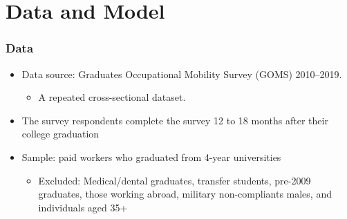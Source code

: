\documentclass[aspectratio=169,xcolor=dvipsnames,handout]{beamer}
\begin{document}
\section{Data and Model}%

\begin{frame}
    \frametitle{Data}
    \begin{itemize}[<+->]
        \item Data source: Graduates Occupational Mobility Survey (GOMS) 2010--2019.
        \begin{itemize}
            \item A repeated cross-sectional dataset.
        \end{itemize}
        \item The survey respondents complete the survey 12 to 18 months after their college graduation
        \item Sample: paid workers who graduated from 4-year universities
        \begin{itemize}
            \item Excluded: Medical/dental graduates, transfer students, pre-2009 graduates, those working abroad, military non-compliants males, and individuals aged 35+
        \end{itemize}
    \end{itemize}
\end{frame}
\end{document}
